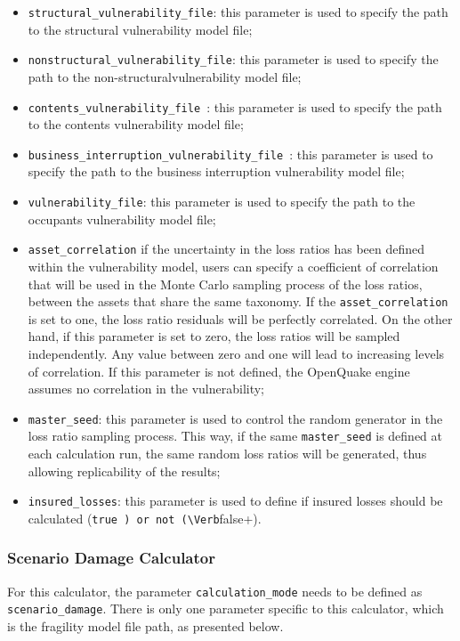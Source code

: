 \begin{itemize}
\item  \Verb+structural_vulnerability_file+: this parameter is used to specify the path to the structural \gls{vulnerability model} file;
\item  \Verb+nonstructural_vulnerability_file+: this parameter is used to specify the path to the non-structural\gls{vulnerability model} file;
\item  \Verb+contents_vulnerability_file +: this parameter is used to specify the path to the contents \gls{vulnerability model} file;
\item  \Verb+business_interruption_vulnerability_file +: this parameter is used to specify the path to the business interruption \gls{vulnerability model} file;
\item  \Verb+vulnerability_file+: this parameter is used to specify the path to the occupants \gls{vulnerability model} file;
\item \texttt{asset\_cor\-re\-la\-tion} if the uncertainty in the loss ratios has been defined within the \gls{vulnerability model}, users can specify a coefficient of correlation that will be used in the Monte Carlo sampling process of the loss ratios, between the assets that share the same \gls{taxonomy}. If the \texttt{asset\_cor\-re\-la\-tion} is set to one, the loss ratio residuals will be perfectly correlated. On the other hand, if this parameter is set to zero, the loss ratios will be sampled independently. Any value between zero and one will lead to increasing levels of correlation. If this parameter is not defined, the OpenQuake engine assumes no correlation in the vulnerability;
\item  \Verb+master_seed+: this parameter is used to control the random generator in the loss ratio sampling process. This way, if the same \Verb+master_seed+ is defined at each calculation run, the same random loss ratios will be generated, thus allowing replicability of the results;
\item  \Verb+insured_losses+: this parameter is used to define if insured losses should be calculated (\Verb+true ) or not (\Verb+false+).
\end{itemize}

\subsubsection{Scenario Damage Calculator}
For this calculator, the parameter \Verb+calculation_mode+ needs to be defined as \Verb+scenario_damage+. There is only one parameter specific to this calculator, which is the \gls{fragility model} file path, as presented below.

